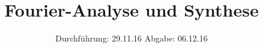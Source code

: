 

\subject{V351}
\title{Fourier-Analyse und Synthese}
\date{
  Durchführung: 29.11.16
  \hspace{3em}
  Abgabe: 06.12.16
}



\maketitle
\thispagestyle{empty}
\tableofcontents
\newpage






\printbibliography



